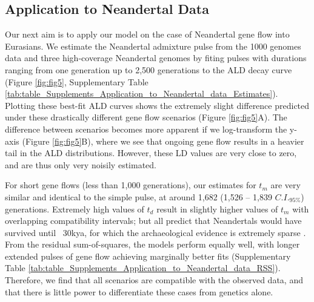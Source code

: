 \documentclass[11pt]{article}
\begin{document}
\subsection{Application to Neandertal Data}
Our next aim is to apply our model on the case of Neandertal gene flow into Eurasians. We estimate the Neandertal admixture pulse from the 1000 genomes data \citep{the_1000_genomes_project_consortium_global_2015} and three high-coverage Neandertal genomes \citep{prufer_complete_2013, prufer_high-coverage_2017, mafessoni_high_coverage_2020} by fiting pulses with durations ranging from one generation up to 2,500 generations to the ALD decay curve (Figure \ref{fig:fig5}, Supplementary Table \ref{tab:table_Supplements_Application_to_Neandertal_data_Estimates}). Plotting these best-fit ALD curves shows the extremely slight difference predicted under these drastically different gene flow scenarios (Figure \ref{fig:fig5}A). The difference between scenarios becomes more apparent if we log-transform the y-axis (Figure \ref{fig:fig5}B), where we see that ongoing gene flow results in a heavier tail in the ALD distributions. However, these LD values are very close to zero, and are thus only very noisily estimated. 

For short gene flows (less than 1,000 generations), our estimates for $t_m$ are very similar and identical to the simple pulse, at around 1,682 (1,526 -- 1,839 $C.I._{95\%}$) generations. Extremely high values of $t_d$ result in slightly higher values of $t_m$ with overlapping compatibility intervals; but all predict that Neandertals would have survived until ~30kya, for which the archaeological evidence is extremely sparse \citep{hublin_last_2017}.  From the residual sum-of-squares, the models perform equally well, with longer extended pulses of gene flow achieving marginally better fits (Supplementary Table \ref{tab:table_Supplements_Application_to_Neandertal_data_RSS}). Therefore, we find that all scenarios are compatible with the observed data, and that there is little power to differentiate these cases from genetics alone.  
\end{document}
